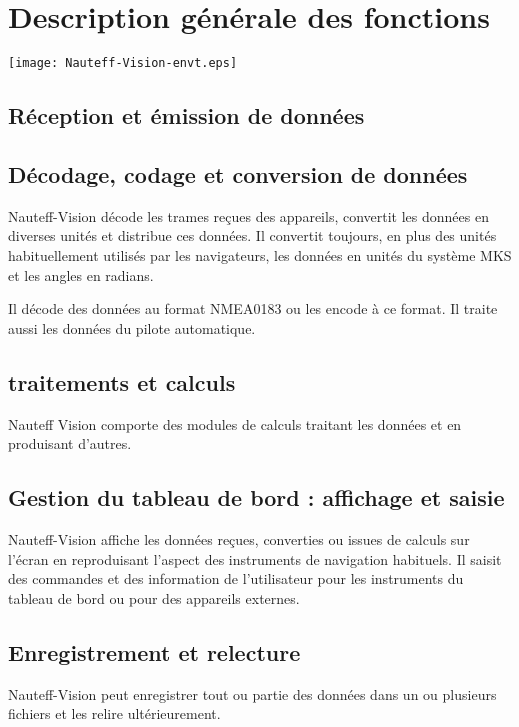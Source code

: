 \documentclass[a4paper,11pt]{report}
\begin{document}
\section{Description générale des fonctions}

\texttt{[image: Nauteff-Vision-envt.eps]}

\subsection{Réception et émission de données}



\subsection{Décodage, codage et conversion de données}

Nauteff-Vision décode les trames reçues des appareils,
convertit les données en diverses unités et distribue ces données.
Il convertit toujours, en plus des unités habituellement utilisés
par les navigateurs, les données en unités du système MKS et les angles en radians.

Il décode des données au format \gls{NMEA0183} ou les encode à ce format.
Il traite aussi les données du pilote automatique.


\subsection{traitements et calculs}

Nauteff Vision comporte des modules de calculs traitant les données
et en produisant d'autres.


\subsection{Gestion du tableau de bord : affichage et saisie}

Nauteff-Vision affiche les données reçues, converties ou issues de calculs sur l'écran
en reproduisant l'aspect des instruments de navigation habituels.
Il saisit des commandes et des information de l'utilisateur
pour les instruments du tableau de bord ou pour des appareils externes.

\subsection{Enregistrement et relecture}

Nauteff-Vision peut enregistrer tout ou partie des données
dans un ou plusieurs fichiers et les relire ultérieurement.
\end{document}
